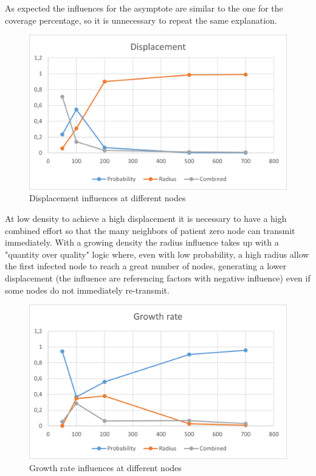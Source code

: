 As expected the influences for the asymptote are similar to the one for the coverage percentage, so it is unnecessary to repeat the same explanation.

\begin{figure}[H]\label{pic:DisplacementNodes}
\centering
    \includegraphics[width= 1\textwidth]{./images/DisplacementWithNodes.png}
    \caption{Displacement influences at different nodes}
\end{figure}

At low density to achieve a high displacement it is necessary to have a high combined effort so that the many neighbors of patient zero node can transmit immediately. With a growing density the radius influence takes up with a "quantity over quality" logic where, even with low probability, a high radius allow the first infected node to reach a great number of nodes, generating a lower displacement (the influence are referencing factors with negative influence) even if some nodes do not immediately re-transmit.

\begin{figure}[H]\label{pic:GrowthRatesNodes}
\centering
    \includegraphics[width= 1\textwidth]{./images/GrowthRateWithNodes.png}
    \caption{Growth rate influences at different nodes}
\end{figure}

